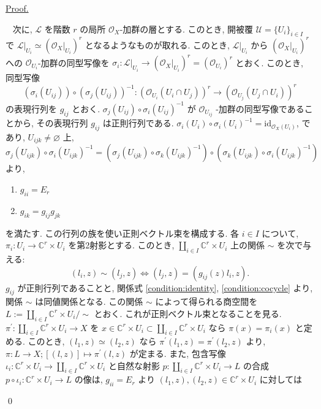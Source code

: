 \documentclass[a4paper,10pt,dvipdfmx]{jsreport}
\renewenvironment{proof}{\begin{flushleft} \underline{Proof.} \end{flushleft}\vspace{-1zh}\ }{\qed\\}
\renewcommand{\emptyset}{\varnothing}
\newcommand{\id}{\textrm{id}}
\theoremstyle{definition}
\begin{document}
\begin{proof}
    次に, \(\mathcal{L}\) を階数 \(r\) の局所 \(\mathcal{O}_X\)-加群の層とする. このとき, 開被覆 \(\mathcal{U} = \{U_i\}_{i \in I}\) で \(\mathcal{L}|_{U_i} \simeq (\mathcal{O}_X|_{U_i})^r\) となるようなものが取れる. このとき, \(\mathcal{L}|_{U_i}\) から \((\mathcal{O}_X|_{U_i})^r\) への \(\mathcal{O}_{U_i}\)-加群の同型写像を \(\sigma_i \colon \mathcal{L}|_{U_i} \to (\mathcal{O}_X|_{U_i})^r = (\mathcal{O}_{U_i})^r\) とおく. このとき, 同型写像
    \[
        (\sigma_i(U_{ij})) \circ (\sigma_j(U_{ij}))^{-1} \colon (\mathcal{O}_{U_i}(U_i \cap U_j))^r \to (\mathcal{O}_{U_j}(U_j \cap U_i))^r
    \]
    の表現行列を \(g_{ij}\) とおく. \(\sigma_j(U_{ij}) \circ \sigma_i(U_{ij})^{-1}\) が \(\mathcal{O}_{U_{ij}}\) -加群の同型写像であることから, その表現行列 \(g_{ij}\) は正則行列である. \(\sigma_i(U_i) \circ \sigma_i(U_i)^{-1} = \id_{\mathcal{O}_X(U_i)}\), であり, \(U_{ijk} \neq \emptyset\) 上, \(\sigma_j(U_{ijk}) \circ \sigma_i(U_{ijk})^{-1} = (\sigma_j(U_{ijk}) \circ \sigma_k(U_{ijk})^{-1})\circ (\sigma_k(U_{ijk}) \circ \sigma_i(U_{ijk})^{-1})\) より,
    \begin{enumerate}
        \item \(g_{ii} = E_r\) \label{condition:identity}
        \item \(g_{ik} = g_{ij}g_{jk}\) \label{condition:cocycle}
    \end{enumerate}
    を満たす. この行列の族を使い正則ベクトル束を構成する. 各 \(i\in I\) について, \(\pi_i \colon U_i \to \mathbb{C}^r \times U_i\) を第2射影とする. このとき, \(\coprod_{i\in I}\mathbb{C}^r \times U_i\) 上の関係 \(\sim\) を次で与える:
    \[
        (l_i,z) \sim (l_j ,z) \iff (l_j,z) = (g_{ij}(z)l_i,z).
    \] 
    \(g_{ij}\) が正則行列であることと, 関係式 \ref{condition:identity}, \ref{condition:cocycle} より, 関係 \(\sim\) は同値関係となる. この関係 \(\sim\) によって得られる商空間を \(L:= \coprod_{i\in I}\mathbb{C}^r \times U_i/\sim\) とおく. これが正則ベクトル束となることを見る. \(\pi^\prime \colon \coprod_{i\in I}\mathbb{C}^r \times U_i \to X\) を \(x\in \mathbb{C}^r \times U_i \subset  \coprod_{i\in I}\mathbb{C}^r \times U_i\) なら \(\pi(x) = \pi_i(x)\) と定める. このとき, \((l_1,z) \simeq (l_2,z)\) なら \(\pi^\prime(l_1,z) = \pi^\prime(l_2,z)\) より, \(\pi \colon L \to X;[(l,z)] \mapsto \pi^\prime (l,z)\) が定まる. また, 包含写像 \(\iota_i \colon \mathbb{C}^r \times U_i \to \coprod_{i\in I}\mathbb{C}^r \times U_i\) と自然な射影 \(p \colon \coprod_{i\in I}\mathbb{C}^r \times U_i \to L\) の合成 \(p \circ \iota_i \colon \mathbb{C}^r \times U_i \to L\) の像は, \(g_{ii} = E_r\) より \((l_1,z),(l_2,z)\in \mathbb{C}^r \times U_i\) に対しては

\end{proof}
\end{document}
